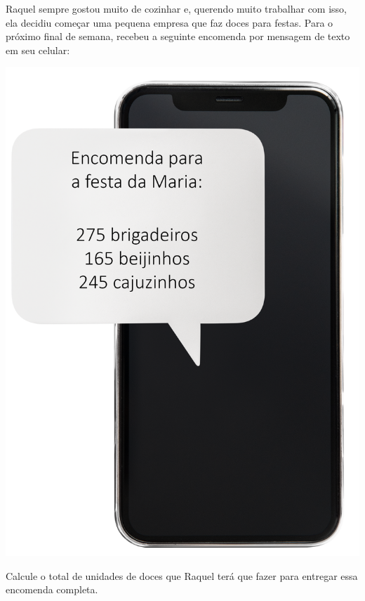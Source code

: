 \begin{minipage}{.5\textwidth}
Raquel sempre gostou muito de cozinhar e,
querendo muito trabalhar com isso, ela decidiu começar uma pequena
empresa que faz doces para festas. Para o próximo final de semana, recebeu a seguinte encomenda por mensagem de texto em seu celular:
\end{minipage}\hspace{.5cm}
\begin{minipage}{.3\textwidth}
\includegraphics[width=\textwidth]{../ilustracoes/MAT5/SAEB_5ANO_MAT_figura18.png}
\end{minipage}

Calcule o total de unidades de doces que Raquel terá que fazer para entregar essa encomenda completa.

\begin{emptybox}
\vspace{5cm}
\end{emptybox}

